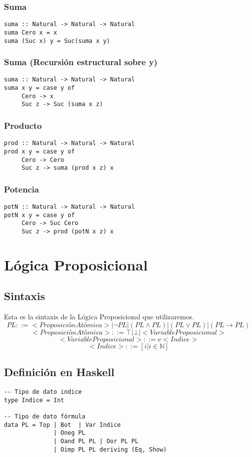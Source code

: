 \documentclass[11pt]{article}
\begin{document}
\subsubsection{Suma}
\label{sec:org24bd34c}
\begin{verbatim}
suma :: Natural -> Natural -> Natural
suma Cero x = x
suma (Suc x) y = Suc(suma x y)
\end{verbatim}
\subsubsection{Suma (Recursión estructural sobre y)}
\label{sec:org5cfaed5}
\begin{verbatim}
suma :: Natural -> Natural -> Natural
suma x y = case y of
     Cero -> x
     Suc z -> Suc (suma x z)
\end{verbatim}
\subsubsection{Producto}
\label{sec:orgda93837}
\begin{verbatim}
prod :: Natural -> Natural -> Natural
prod x y = case y of 
     Cero -> Cero
     Suc z -> suma (prod x z) x
\end{verbatim}
\subsubsection{Potencia}
\label{sec:org58b9989}
\begin{verbatim}
potN :: Natural -> Natural -> Natural
potN x y = case y of
     Cero -> Suc Cero
     Suc z -> prod (potN x z) x 
\end{verbatim}
\section{Lógica Proposicional}
\label{sec:org82dd96b}
\subsection{Sintaxis}
\label{sec:orgd58d379}
Esta es la sintaxis de la Lógica Proposicional que utilizaremos. 
\[PL ::= <ProposiciónAtómica> | \neg PL | (PL \land PL) | (PL \lor PL) | (PL \to PL) \]
\[<ProposiciónAtómica> ::= \top | \bot | <VariableProposicional>\]
\[<VariableProposicional> ::= v<Indice>\]
\[ <Indice> ::= [i | i \in \mathbb{N}]\]

\subsection{Definición en Haskell}
\label{sec:org23d3171}
\begin{verbatim}
-- Tipo de dato indice
type Indice = Int

-- Tipo de dato fórmula
data PL = Top | Bot  | Var Indice
              | Oneg PL 
              | Oand PL PL | Oor PL PL 
              | Oimp PL PL deriving (Eq, Show)
\end{verbatim}
\end{document}
